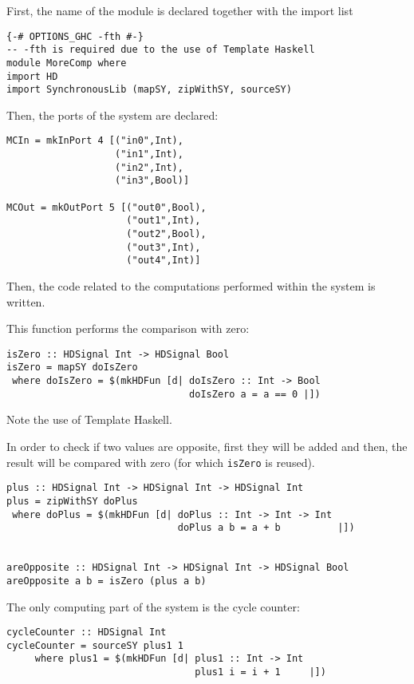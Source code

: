 First, the name of the module is declared together with the import list

\begin{lstlisting}
{-# OPTIONS_GHC -fth #-}
-- -fth is required due to the use of Template Haskell 
module MoreComp where
import HD
import SynchronousLib (mapSY, zipWithSY, sourceSY)
\end{lstlisting}

Then, the ports of the system are declared:

\begin{lstlisting}
MCIn = mkInPort 4 [("in0",Int),
                   ("in1",Int),
                   ("in2",Int),
                   ("in3",Bool)]

MCOut = mkOutPort 5 [("out0",Bool),
                     ("out1",Int),
                     ("out2",Bool),
                     ("out3",Int),
                     ("out4",Int)]
\end{lstlisting}

Then, the code related to the computations performed within the system
is written.

This function performs the comparison with zero:

\begin{lstlisting}
isZero :: HDSignal Int -> HDSignal Bool
isZero = mapSY doIsZero
 where doIsZero = $(mkHDFun [d| doIsZero :: Int -> Bool
                                doIsZero a = a == 0 |])
\end{lstlisting}

Note the use of Template Haskell.

In order to check if two values are opposite, first they will be
added and then, the result will be compared with zero (for which
\texttt{isZero} is reused).

\begin{lstlisting}
plus :: HDSignal Int -> HDSignal Int -> HDSignal Int
plus = zipWithSY doPlus
 where doPlus = $(mkHDFun [d| doPlus :: Int -> Int -> Int
                              doPlus a b = a + b          |])


areOpposite :: HDSignal Int -> HDSignal Int -> HDSignal Bool
areOpposite a b = isZero (plus a b)
\end{lstlisting}

The only computing part of the system is the cycle counter:

\begin{lstlisting}
cycleCounter :: HDSignal Int
cycleCounter = sourceSY plus1 1
     where plus1 = $(mkHDFun [d| plus1 :: Int -> Int
                                 plus1 i = i + 1     |])
\end{lstlisting}
 
